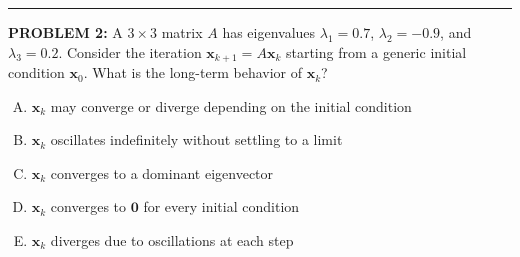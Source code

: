 \documentclass[12pt]{amsart}
\newcommand{\divider}{
  \vspace{-1em} %
  \noindent
  \raisebox{-0.15ex}{\textbullet}%
  \hspace{0.5em}%
  \rule[0.5ex]{0.95\textwidth}{1.0pt}%
  \hspace{0.5em}%
  \raisebox{-0.15ex}{\textbullet}%
  \vspace{0em} %
}
\begin{document}
\divider

{\bf PROBLEM 2:}
%
A $3 \times 3$ matrix $A$ has eigenvalues $\lambda_1 = 0.7$, 
$\lambda_2 = -0.9$, and $\lambda_3 = 0.2$.
%
Consider the iteration $\mathbf{x}_{k+1} = A\mathbf{x}_k$ starting 
from a generic initial condition $\mathbf{x}_0$.
%
What is the long-term behavior of $\mathbf{x}_k$?

\begin{enumerate}[(A)]
\item $\mathbf{x}_k$ may converge or diverge depending on the initial condition
\item $\mathbf{x}_k$ oscillates indefinitely without settling to a limit
\item $\mathbf{x}_k$ converges to a dominant eigenvector
\item $\mathbf{x}_k$ converges to $\mathbf{0}$ for every initial condition
\item $\mathbf{x}_k$ diverges due to oscillations at each step
\end{enumerate}
\end{document}
